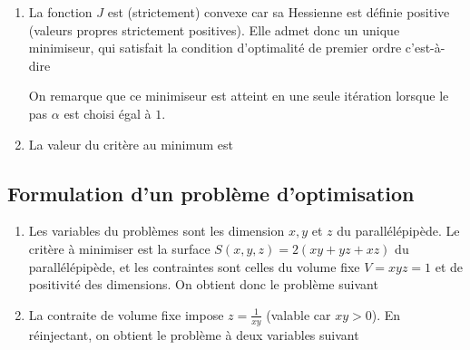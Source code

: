 \documentclass{article}
\begin{document}
\begin{enumerate}
\item La fonction $J$ est (strictement) convexe car sa Hessienne est définie positive (valeurs propres strictement positives). Elle admet donc un unique minimiseur, qui satisfait la condition d'optimalité de premier ordre
c'est-à-dire

On remarque que ce minimiseur est atteint en une seule itération lorsque le pas $\alpha$ est choisi égal à $1$.

\item La valeur du critère au minimum est 

\end{enumerate}


\subsection{Formulation d'un problème d'optimisation}

\begin{enumerate}
	\item Les variables du problèmes sont les dimension $x,y$ et $z$ du parallélépipède. Le critère à minimiser est la surface $S(x,y,z) = 2(xy+yz+xz)$ du parallélépipède, et les contraintes sont celles du volume fixe $V = xyz = 1$ et de positivité des dimensions. On obtient donc le problème suivant
	
	\item La contraite de volume fixe impose $\displaystyle z = \frac{1}{xy}$ (valable car $xy > 0$). En réinjectant, on obtient le problème à deux variables suivant
\end{enumerate} 
\end{document}
